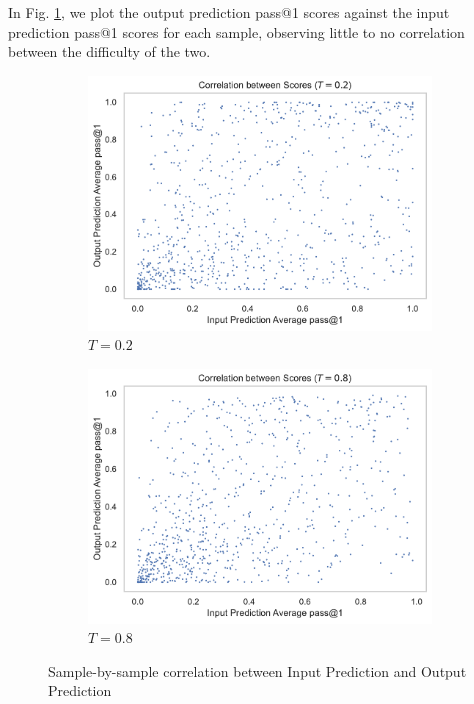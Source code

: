 In Fig. \ref{fig:benchmark-sample-io-correlation}, we plot the output prediction pass@1 scores against the input prediction pass@1 scores for each sample, observing little to no correlation between the difficulty of the two.

\begin{figure}[H]
    \centering
    \begin{subfigure}[b]{0.49\textwidth}
        \includegraphics[width=\textwidth]{figs/benchmark/io_sample_correlation_0.2.pdf}
        \caption{$T=0.2$}
    \end{subfigure}
    \begin{subfigure}[b]{0.49\textwidth}
        \includegraphics[width=\textwidth]{figs/benchmark/io_sample_correlation_0.8.pdf}
        \caption{$T=0.8$}
    \end{subfigure}
    \caption{Sample-by-sample correlation between Input Prediction and Output Prediction}
    \label{fig:benchmark-sample-io-correlation}
\end{figure}

